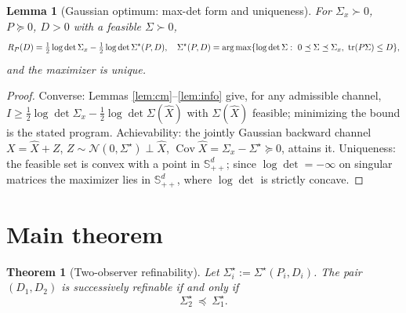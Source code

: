 \documentclass[11pt]{article}
\newtheorem{theorem}{Theorem}\newtheorem{lemma}{Lemma}
\newcommand{\Cov}{\operatorname{Cov}}
\begin{document}
\begin{lemma}[Gaussian optimum: max-det form and uniqueness]\label{lem:unique}
For $\Sigma_x\succ0$, $P\succeq0$, $D>0$ with a feasible
$\Sigma\succ0$,
\[
R_P(D)=\tfrac12\log\det\Sigma_x-\tfrac12\log\det\Sigma^\star(P,D),
\quad
\Sigma^\star(P,D)=\arg\max\{\log\det\Sigma:\ 0\preceq\Sigma\preceq\Sigma_x,\
\tr(P\Sigma)\le D\},
\]
and the maximizer is unique.
\end{lemma}
\begin{proof}
Converse: Lemmas \ref{lem:cm}--\ref{lem:info} give, for any admissible
channel, $I\ge\tfrac12\log\det\Sigma_x-\tfrac12\log\det\Sigma(\hat X)$ with
$\Sigma(\hat X)$ feasible; minimizing the bound is the stated program.
Achievability: the jointly Gaussian backward channel $X=\hat X+Z$,
$Z\sim\mathcal N(0,\Sigma^\star)\perp\hat X$,
$\Cov\hat X=\Sigma_x-\Sigma^\star\succeq0$, attains it. Uniqueness: the
feasible set is convex with a point in $\mathbb S^d_{++}$; since
$\log\det=-\infty$ on singular matrices the maximizer lies in
$\mathbb S^d_{++}$, where $\log\det$ is strictly concave.
\end{proof}

\section{Main theorem}
\begin{theorem}[Two-observer refinability]\label{thm:main}
Let $\Sigma_i^\star:=\Sigma^\star(P_i,D_i)$. The pair $(D_1,D_2)$ is
successively refinable if and only if
\[
\Sigma_2^\star\ \preceq\ \Sigma_1^\star .
\]
\end{theorem}
\end{document}

